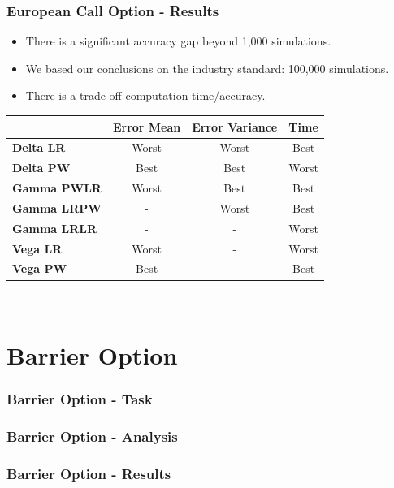 \documentclass[12pt]{beamer}
\begin{document}
\begin{frame}
\frametitle{European Call Option - Results}
\begin{itemize}
  \item There is a significant accuracy gap beyond 1,000 simulations.
  \item We based our conclusions on the industry standard: 100,000 simulations.
  \item There is a trade-off computation time/accuracy.
\end{itemize}



\begin{table}
  \centering
\begin{tabular}{|l|c|c|c|}
\hline
& \textbf{Error Mean} & \textbf{Error Variance} & \textbf{Time} \\ \hline
\textbf{Delta LR} & Worst & Worst & Best\\
\textbf{Delta PW} & Best & Best & Worst\\ \hline
\textbf{Gamma PWLR} & Worst & Best & Best\\
\textbf{Gamma LRPW} & - & Worst & Best\\
\textbf{Gamma LRLR} & - & - & Worst\\ \hline
\textbf{Vega LR} & Worst & - & Worst\\
\textbf{Vega PW} & Best & - & Best\\ \hline
\end{tabular}\\

\end{table}

\end{frame}




\section{Barrier Option}
\begin{frame}
\frametitle{Barrier Option - Task}

\end{frame}

\begin{frame}
\frametitle{Barrier Option - Analysis}
\end{frame}

\begin{frame}
\frametitle{Barrier Option - Results}

\end{frame}
\end{document}

